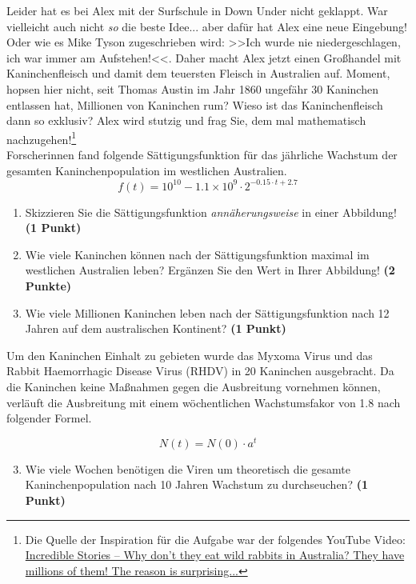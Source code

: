 \documentclass[a4paper, 9pt]{scrartcl}\usepackage[]{graphicx}\usepackage[]{xcolor}
\begin{document}
Leider hat es bei Alex mit der Surfschule in Down Under nicht geklappt. War vielleicht auch nicht \textit{so} die beste Idee... aber dafür hat Alex eine neue Eingebung! Oder wie es Mike Tyson zugeschrieben wird: >>Ich wurde nie niedergeschlagen, ich war immer am Aufstehen!<<. Daher macht Alex jetzt einen Großhandel mit Kaninchenfleisch und damit dem teuersten Fleisch in Australien auf. Moment, hopsen hier nicht, seit Thomas Austin im Jahr 1860 ungefähr 30 Kaninchen entlassen hat, Millionen von Kaninchen rum? Wieso ist das Kaninchenfleisch dann so exklusiv? Alex wird stutzig und frag Sie, dem mal mathematisch nachzugehen!\footnote{Die Quelle der Inspiration für die Aufgabe war der folgendes YouTube Video: \href{https://youtu.be/38fuOr3tdgc?si=Li7NL_FoByML8JtT}{ Incredible Stories -- Why don't they eat wild rabbits in Australia? They have    millions of them! The reason is surprising...}} \\

Forscherinnen fand folgende Sättigungsfunktion für das jährliche Wachstum der gesamten Kaninchenpopulation im westlichen Australien.
\begin{equation*}
  f(t) = \ensuremath{10^{10}} - \ensuremath{1.1\times 10^{9}} \cdot 2^{-0.15 \cdot t + 2.7}
\end{equation*}

\begin{enumerate}
\item Skizzieren Sie die Sättigungsfunktion \textit{annäherungsweise} in einer Abbildung! \textbf{(1 Punkt)}
\item Wie viele Kaninchen können nach der Sättigungsfunktion maximal im westlichen Australien leben? Ergänzen Sie den Wert in Ihrer Abbildung! \textbf{(2 Punkte)}
\item Wie viele Millionen Kaninchen leben nach der Sättigungsfunktion nach 12 Jahren auf dem australischen Kontinent? \textbf{(1 Punkt)}
\end{enumerate}

Um den Kaninchen Einhalt zu gebieten wurde das Myxoma Virus und das Rabbit Haemorrhagic Disease Virus (RHDV) in 20 Kaninchen ausgebracht. Da die Kaninchen keine Maßnahmen gegen die Ausbreitung vornehmen können, verläuft die Ausbreitung mit einem wöchentlichen Wachstumsfakor von 1.8 nach folgender Formel.

\begin{equation*}
  N(t) = N(0) \cdot a^t
\end{equation*}

\begin{enumerate}
  \setcounter{enumi}{2}
\item Wie viele Wochen benötigen die Viren um theoretisch die gesamte Kaninchenpopulation nach 10 Jahren Wachstum zu durchseuchen? \textbf{(1 Punkt)}
\end{enumerate}
\end{document}
